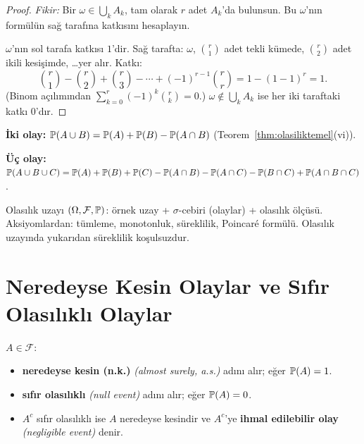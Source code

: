 \begin{proof}
\textit{Fikir:} Bir $\omega \in \bigcup_k A_k$, tam olarak $r$ adet $A_k$'da
bulunsun. Bu $\omega$'nın formülün sağ tarafına katkısını hesaplayın.

\medskip

$\omega$'nın sol tarafa katkısı $1$'dir. Sağ tarafta: $\omega$, $\binom{r}{1}$
adet tekli kümede, $\binom{r}{2}$ adet ikili kesişimde, \ldots yer alır.
Katkı:
\[
  \binom{r}{1} - \binom{r}{2} + \binom{r}{3} - \cdots + (-1)^{r-1}\binom{r}{r}
  = 1 - (1-1)^r = 1.
\]
(Binom açılımından $\sum_{k=0}^r (-1)^k \binom{r}{k} = 0$.)
$\omega \notin \bigcup_k A_k$ ise her iki taraftaki katkı $0$'dır.
\end{proof}

\begin{ornek}\label{ex:poincare}
\textbf{İki olay:}
$\mathbb{P}(A \cup B) = \mathbb{P}(A) + \mathbb{P}(B) - \mathbb{P}(A \cap B)$ (Teorem~\ref{thm:olasiliktemel}(vi)).

\textbf{Üç olay:}
$\mathbb{P}(A \cup B \cup C) = \mathbb{P}(A) + \mathbb{P}(B) + \mathbb{P}(C)
- \mathbb{P}(A \cap B) - \mathbb{P}(A \cap C) - \mathbb{P}(B \cap C)
+ \mathbb{P}(A \cap B \cap C)$.
\end{ornek}

\begin{mikroozet}[§2.1 özeti]
Olasılık uzayı $(\Omega,\mathcal{F},\mathbb{P})$: örnek uzay + $\sigma$-cebiri (olaylar) +
olasılık ölçüsü. Aksiyomlardan: tümleme, monotonluk, süreklilik, Poincaré formülü.
Olasılık uzayında yukarıdan süreklilik koşulsuzdur.
\end{mikroozet}


\section{Neredeyse Kesin Olaylar ve Sıfır Olasılıklı Olaylar}

\begin{tanim}\label{def:neredeyse_kesin}
$A \in \mathcal{F}$:
\begin{itemize}
  \item \textbf{neredeyse kesin (n.k.)} \emph{(almost surely, a.s.)} adını alır;
        eğer $\mathbb{P}(A) = 1$.
  \item \textbf{sıfır olasılıklı} \emph{(null event)} adını alır;
        eğer $\mathbb{P}(A) = 0$.
  \item $A^c$ sıfır olasılıklı ise $A$ neredeyse kesindir ve $A^c$'ye
        \textbf{ihmal edilebilir olay} \emph{(negligible event)} denir.
\end{itemize}
\end{tanim}

